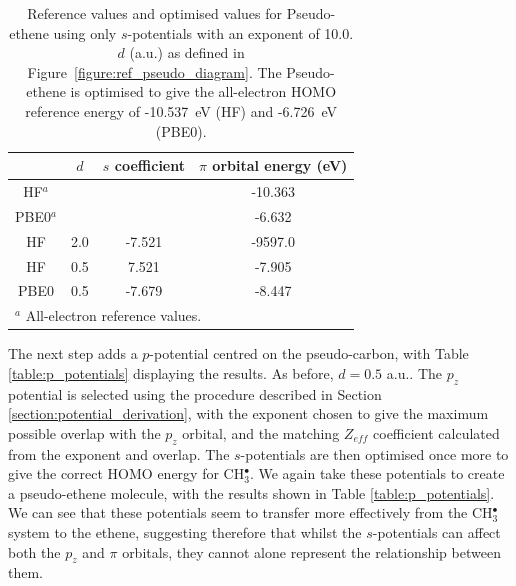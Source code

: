 \documentclass[journal=jctcce,manuscript=article]{achemso}
\begin{document}
\begin{table}[ht]
\caption{Reference values and optimised values for Pseudo-ethene using only \(s\)-potentials with an exponent of 10.0.
$d$ (a.u.) as defined in Figure~\ref{figure:ref_pseudo_diagram}. The Pseudo-ethene is optimised to give 
the all-electron HOMO reference energy of  -10.537~eV (HF) and -6.726~eV (PBE0).}
\begin{tabular}{c c c c}
\hline
& $d$ & \(s\) coefficient & \( \pi \) orbital energy (eV) \\
\hline
HF$^a$   &     &        & -10.363 \\
PBE0$^a$ &     &        & -6.632 \\
HF       & 2.0 & -7.521 & -9597.0 \\
HF       & 0.5 & 7.521  & -7.905 \\
PBE0     & 0.5 &-7.679  & -8.447 \\
\hline
\multicolumn{4}{l}{$^a$ All-electron reference values.}\\
\end{tabular}
\label{table:ethene_s_pseudo}
\end{table}

The next step adds a \(p\)-potential centred on the pseudo-carbon, with Table \ref{table:p_potentials} displaying the results. As before, \(d = 0.5\) a.u.. The \(p_{z}\) potential is selected using the procedure described in Section \ref{section:potential_derivation}, with the exponent chosen to give the maximum possible overlap with the \(p_{z}\) orbital, and the matching \(Z_{eff}\) coefficient calculated from the exponent and overlap. The \(s\)-potentials are then optimised once more to give the correct HOMO energy for CH\(^{\bullet}_{3}\). We again take these potentials to create a pseudo-ethene molecule, with the results shown in Table \ref{table:p_potentials}. We can see that these potentials seem to transfer more effectively from the CH\(^{\bullet}_{3}\) system to the ethene, suggesting therefore that whilst the \(s\)-potentials can affect both the \(p_{z}\) and \(\pi\) orbitals, they cannot alone represent the relationship between them.
\end{document}
